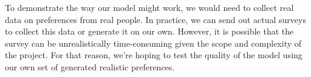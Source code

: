 \documentclass[12pt]{article}
\begin{document}
    
    To demonstrate the way our model might work, we would need to collect real data on preferences from real people. In practice, we can send out actual surveys to collect this data or generate it on our own. However, it is possible that the survey can be unrealistically time-consuming given the scope and complexity of the project. For that reason, we're hoping to test the quality of the model using our own set of generated realistic preferences.
\end{document}
